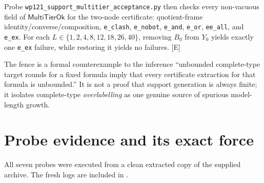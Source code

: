 \documentclass[11pt,letterpaper]{article}
\newcommand{\MultiTierOk}{\ensuremath{\mathsf{MultiTierOk}}}
\newcommand{\code}[1]{\nolinkurl{#1}}
\theoremstyle{definition}
\theoremstyle{plain}
\theoremstyle{remark}
\begin{document}
Probe \code{wp121_support_multitier_acceptance.py} then checks every
non-vacuous field of \MultiTierOk{} for the two-node certificate: quotient-frame
identity/converse/composition, \code{e_clash}, \code{e_nobot}, \code{e_and},
\code{e_or}, \code{ee_all}, and \code{e_ex}.  For each
$L\in\{1,2,4,8,12,18,26,40\}$, removing $B_0$ from $Y_0$ yields exactly one
\code{e_ex} failure, while restoring it yields no failures. [E]

\begin{resultbox}
The fence is a formal counterexample to the inference
``unbounded complete-type target rounds for a fixed formula imply that every
certificate extraction for that formula is unbounded.''  It is not a proof
that support generation is always finite; it isolates complete-type
\emph{overlabelling} as one genuine source of spurious model-length growth.
\end{resultbox}

\section{Probe evidence and its exact force}

All seven probes were executed from a clean extracted copy of the supplied
archive.  The fresh logs are included in .
\end{document}
